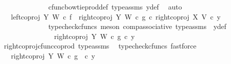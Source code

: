 \begin{isabellebody}
\ \ \ \ \ \ \ \ \ \ \ \ \isamarkupfalse%
\ cfunc{\isacharunderscore}{\kern0pt}bowtie{\isacharunderscore}{\kern0pt}prod{\isacharunderscore}{\kern0pt}def{}\ type{\isacharunderscore}{\kern0pt}assms\ y{}{\isacharunderscore}{\kern0pt}def\ \isamarkupfalse%
\ auto\isanewline
\ \ \ \ \ \ \ \ \ \ \isamarkupfalse%
\ \isamarkupfalse%
\ {\isachardoublequoteopen}{\isachardot}{\kern0pt}{\isachardot}{\kern0pt}{\isachardot}{\kern0pt}\ {\isacharequal}{\kern0pt}\ {\isacharparenleft}{\kern0pt}{\isacharparenleft}{\kern0pt}{\isacharparenleft}{\kern0pt}left{\isacharunderscore}{\kern0pt}coproj\ Y\ W\ {\isasymcirc}\isactrlsub c\ f{\isacharparenright}{\kern0pt}\ {\isasymamalg}\ {\isacharparenleft}{\kern0pt}right{\isacharunderscore}{\kern0pt}coproj\ Y\ W\ {\isasymcirc}\isactrlsub c\ g{\isacharparenright}{\kern0pt}{\isacharparenright}{\kern0pt}\ {\isasymcirc}\isactrlsub c\ right{\isacharunderscore}{\kern0pt}coproj\ X\ V{\isacharparenright}{\kern0pt}\ {\isasymcirc}\isactrlsub c\ y{}{\isachardoublequoteclose}\isanewline
\ \ \ \ \ \ \ \ \ \ \ \ \isamarkupfalse%
\ {\isacharparenleft}{\kern0pt}typecheck{\isacharunderscore}{\kern0pt}cfuncs{\isacharcomma}{\kern0pt}\ meson\ comp{\isacharunderscore}{\kern0pt}associative{}\ type{\isacharunderscore}{\kern0pt}assms\ \ y{}{\isacharunderscore}{\kern0pt}def{\isacharparenright}{\kern0pt}\isanewline
\ \ \ \ \ \ \ \ \ \ \isamarkupfalse%
\ \isamarkupfalse%
\ {\isachardoublequoteopen}{\isachardot}{\kern0pt}{\isachardot}{\kern0pt}{\isachardot}{\kern0pt}\ {\isacharequal}{\kern0pt}\ {\isacharparenleft}{\kern0pt}right{\isacharunderscore}{\kern0pt}coproj\ Y\ W\ {\isasymcirc}\isactrlsub c\ g{\isacharparenright}{\kern0pt}\ {\isasymcirc}\isactrlsub c\ y{}{\isachardoublequoteclose}\isanewline
\ \ \ \ \ \ \ \ \ \ \ \ \isamarkupfalse%
\ right{\isacharunderscore}{\kern0pt}coproj{\isacharunderscore}{\kern0pt}cfunc{\isacharunderscore}{\kern0pt}coprod\ type{\isacharunderscore}{\kern0pt}assms\ \isamarkupfalse%
\ {\isacharparenleft}{\kern0pt}typecheck{\isacharunderscore}{\kern0pt}cfuncs{\isacharcomma}{\kern0pt}\ fastforce{\isacharparenright}{\kern0pt}\isanewline
\ \ \ \ \ \ \ \ \ \ \isamarkupfalse%
\ \isamarkupfalse%
\ {\isachardoublequoteopen}{\isachardot}{\kern0pt}{\isachardot}{\kern0pt}{\isachardot}{\kern0pt}\ {\isacharequal}{\kern0pt}\ right{\isacharunderscore}{\kern0pt}coproj\ Y\ W\ {\isasymcirc}\isactrlsub c\ g\ \ {\isasymcirc}\isactrlsub c\ y{}{\isachardoublequoteclose}\isanewline

\end{isabellebody}
